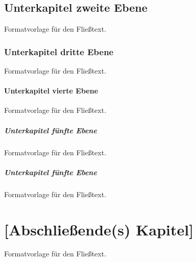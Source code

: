 \section{Unterkapitel zweite Ebene}
Formatvorlage für den Fließtext.

\subsection{Unterkapitel dritte Ebene}
Formatvorlage für den Fließtext.

\subsubsection{Unterkapitel vierte Ebene}
Formatvorlage für den Fließtext.

\paragraph{Unterkapitel fünfte Ebene}\mbox{}\newline
Formatvorlage für den Fließtext.

\paragraph{Unterkapitel fünfte Ebene}\mbox{}\newline
Formatvorlage für den Fließtext.


\chapter{[Abschließende(s) Kapitel]}
Formatvorlage für den Fließtext.
